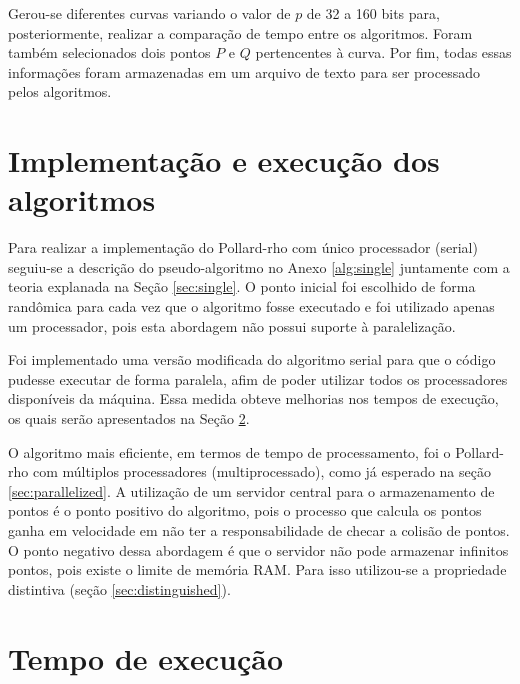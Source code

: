 Gerou-se diferentes curvas variando o valor de \(p\) de 32 a 160 bits para, posteriormente, realizar a comparação de tempo entre os algoritmos. Foram também selecionados dois pontos \(P\) e \(Q\) pertencentes à curva. Por fim, todas essas informações foram armazenadas em um arquivo de texto para ser processado pelos algoritmos.

\section{Implementação e execução dos algoritmos}
Para realizar a implementação do Pollard-rho com único processador (serial) seguiu-se a descrição do pseudo-algoritmo no Anexo \ref{alg:single} juntamente com a teoria explanada na Seção \ref{sec:single}. O ponto inicial foi escolhido de forma randômica para cada vez que o algoritmo fosse executado e foi utilizado apenas um processador, pois esta abordagem não possui suporte à paralelização.

Foi implementado uma versão modificada do algoritmo serial para que o código pudesse executar de forma paralela, afim de poder utilizar todos os processadores disponíveis da máquina. Essa medida obteve melhorias nos tempos de execução, os quais serão apresentados na Seção \ref{sec:execution_time}.

O algoritmo mais eficiente, em termos de tempo de processamento, foi o Pollard-rho com múltiplos processadores (multiprocessado), como já esperado na seção \ref{sec:parallelized}. A utilização de um servidor central para o armazenamento de pontos é o ponto positivo do algoritmo, pois o processo que calcula os pontos ganha em velocidade em não ter a responsabilidade de checar a colisão de pontos. O ponto negativo dessa abordagem é que o servidor não pode armazenar infinitos pontos, pois existe o limite de memória RAM. Para isso utilizou-se a propriedade distintiva (seção \ref{sec:distinguished}).

\section{Tempo de execução}
\label{sec:execution_time}

